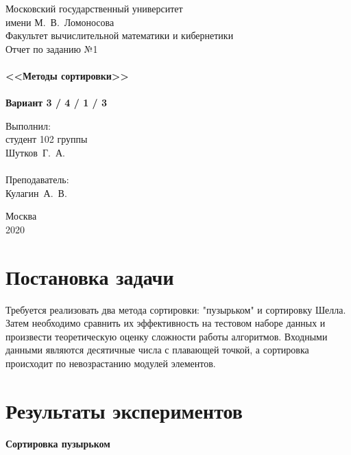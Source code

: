 \documentclass[a4paper,12pt,titlepage,finall]{article}
\begin{document}
\begin{titlepage}
    \begin{center}
	{\small \sc Московский государственный университет \\имени М.~В.~Ломоносова\\
	Факультет вычислительной математики и кибернетики\\}
	\vfill
	{\Large \sc Отчет по заданию №1}\\
	~\\
	{\large \bf <<Методы сортировки>>}\\ 
	~\\
	{\large \bf Вариант 3 / 4 / 1 / 3}
    \end{center}
    \begin{flushright}
	\vfill {Выполнил:\\
	студент 102 группы\\
	Шутков~Г.~А.\\
	~\\
	Преподаватель:\\
	Кулагин~А.~В.}
    \end{flushright}
    \begin{center}
	\vfill
	{\small Москва\\2020}
    \end{center}
\end{titlepage}

\tableofcontents
    
\newpage

\section{Постановка задачи}

Требуется реализовать два метода сортировки: "пузырьком" и сортировку Шелла. Затем необходимо
сравнить их эффективность на тестовом наборе данных и произвести теоретическую оценку
сложности работы алгоритмов. Входными данными являются десятичные числа с плавающей точкой, 
а сортировка происходит по невозрастанию модулей элементов.

\newpage

\section{Результаты экспериментов}

\textbf{Сортировка пузырьком}
\end{document}
